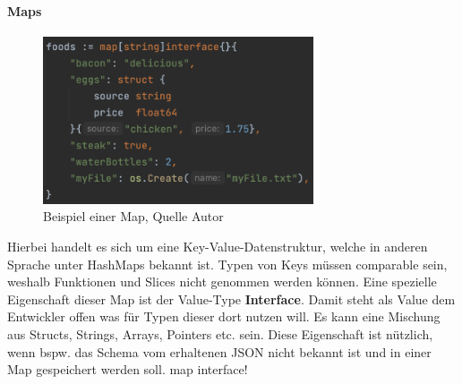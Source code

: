 \documentclass[12pt,titlepage]{article}
\begin{document}
\paragraph{Maps}
\begin{figure}
	\centering
	\includegraphics[width=8cm]{map-example}
	\caption{Beispiel einer Map, Quelle Autor}\label{map}
\end{figure}
Hierbei handelt es sich um eine Key-Value-Datenstruktur, welche in anderen Sprache unter HashMaps bekannt ist.
Typen von Keys müssen comparable sein, weshalb Funktionen und Slices nicht genommen werden können.
Eine spezielle Eigenschaft dieser Map ist der Value-Type \textbf{Interface}.
Damit steht als Value dem Entwickler offen was für Typen dieser dort nutzen will.
Es kann eine Mischung aus Structs, Strings, Arrays, Pointers etc. sein.
Diese Eigenschaft ist nützlich, wenn bspw. das Schema vom erhaltenen JSON nicht bekannt ist und in einer Map gespeichert werden soll.
map interface!
\end{document}
